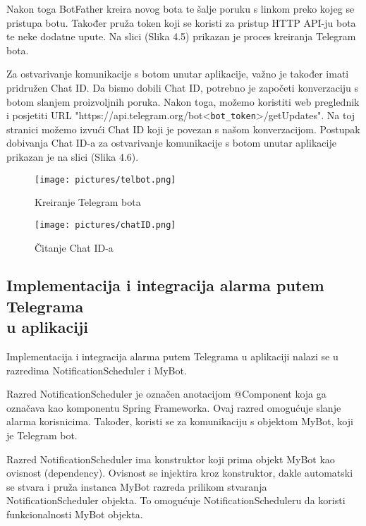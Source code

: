 \documentclass[times, utf8, zavrsni]{fer}
\begin{document}
Nakon toga BotFather kreira novog bota te šalje poruku s linkom preko kojeg se pristupa botu. Također pruža token koji se koristi za pristup HTTP API-ju  bota te neke dodatne upute. Na slici (Slika 4.5) prikazan je proces kreiranja Telegram bota.

Za ostvarivanje komunikacije s botom unutar aplikacije, važno je također imati pridružen Chat ID. Da bismo dobili Chat ID, potrebno je započeti konverzaciju s botom slanjem proizvoljnih poruka. Nakon toga, možemo koristiti web preglednik i posjetiti URL "https://api.telegram.org/bot<\texttt{bot\_token}>/getUpdates". Na toj stranici možemo izvući Chat ID koji je povezan s našom konverzacijom. Postupak dobivanja Chat ID-a za ostvarivanje komunikacije s botom unutar aplikacije prikazan je na slici (Slika 4.6).

    \begin{figure}[h!]
			\texttt{[image: pictures/telbot.png]} %
		\centering
			\caption{Kreiranje Telegram bota}
			\label{fig:promjene}
     \end{figure}

      \begin{figure}[h!]
			\texttt{[image: pictures/chatID.png]} %
		\centering
			\caption{Čitanje Chat ID-a}
			\label{fig:promjene}
     \end{figure}

\vspace{\baselineskip}
\newpage
\subsection{Implementacija i integracija alarma putem Telegrama \\ u aplikaciji}
Implementacija i integracija alarma putem Telegrama u aplikaciji nalazi se u razredima {\selectfont NotificationScheduler} i {\selectfont MyBot}.

Razred {\selectfont NotificationScheduler} je označen anotacijom @Component koja ga označava kao komponentu Spring Frameworka. Ovaj razred omogućuje slanje alarma korisnicima. Također, koristi se za komunikaciju s objektom {\selectfont MyBot}, koji je Telegram bot.

Razred {\selectfont NotificationScheduler} ima konstruktor koji prima objekt {\selectfont MyBot} kao ovisnost (dependency). Ovisnost se injektira kroz konstruktor, dakle 
automatski se stvara i pruža instanca {\selectfont MyBot} razreda prilikom stvaranja {\selectfont NotificationScheduler} objekta. To omogućuje {\selectfont NotificationScheduleru} da koristi funkcionalnosti {\selectfont MyBot} objekta.
\end{document}
